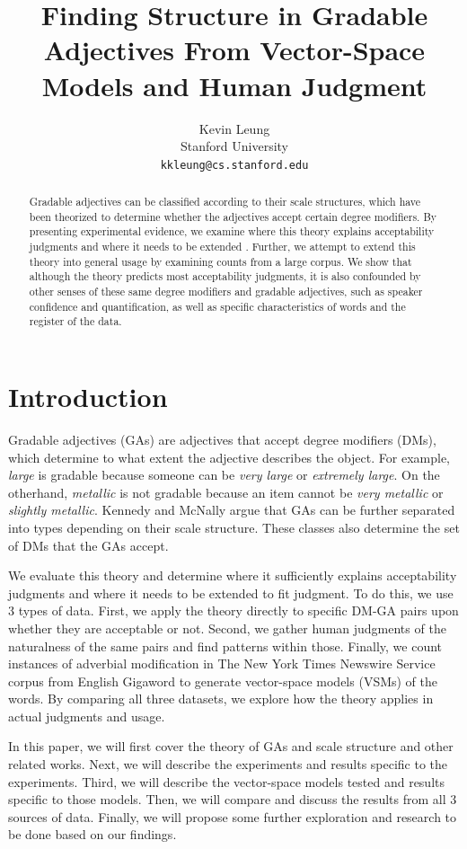 \documentclass[11pt]{article}
\title{Finding Structure in Gradable Adjectives From Vector-Space Models and Human Judgment}
\author{
  Kevin Leung \\
  Stanford University \\
  {\tt kkleung@cs.stanford.edu}}
\date{}
\begin{document}
\maketitle
\begin{abstract}
Gradable adjectives can be classified according to their scale structures, which have been theorized to determine whether the adjectives accept certain degree modifiers. By presenting experimental evidence, we examine where this theory explains acceptability judgments and where it needs to be extended . Further, we attempt to extend this theory into general usage by examining counts from a large corpus. We show that although the theory predicts most acceptability judgments, it is also confounded by other senses of these same degree modifiers and gradable adjectives, such as speaker confidence and quantification, as well as specific characteristics of words and the register of the data.
\end{abstract}

\section{Introduction}

Gradable adjectives (GAs) are adjectives that accept degree modifiers (DMs), which determine to what extent the adjective describes the object. For example, \textit{large} is gradable because someone can be \textit{very large} or \textit{extremely large}. On the otherhand, \textit{metallic} is not gradable because an item cannot be \textit{very metallic} or \textit{slightly metallic}. Kennedy and McNally  argue that GAs can be further separated into types depending on their scale structure. These classes also determine the set of DMs that the GAs accept.

We evaluate this theory and determine where it sufficiently explains acceptability judgments and where it needs to be extended to fit judgment. To do this, we use 3 types of data. First, we apply the theory directly to specific DM-GA pairs upon whether they are acceptable or not. Second, we gather human judgments of the naturalness of the same pairs and find patterns within those. Finally, we count instances of adverbial modification in The New York Times Newswire Service corpus from English Gigaword to generate vector-space models (VSMs) of the words. By comparing all three datasets, we explore how the theory applies in actual judgments and usage.

In this paper, we will first cover the theory of GAs and scale structure and other related works. Next, we will describe the experiments and results specific to the experiments. Third, we will describe the vector-space models tested and results specific to those models. Then, we will compare and discuss the results from all 3 sources of data. Finally, we will propose some further exploration and research to be done based on our findings.
\end{document}
